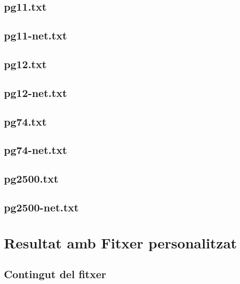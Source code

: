 \documentclass[11pt,a4paper,twoside]{report}
\begin{document}
\subsection{pg11.txt}
\small{}

\subsection{pg11-net.txt}
\small{}

\subsection{pg12.txt}
\small{}

\subsection{pg12-net.txt}
\small{}

\subsection{pg74.txt}
\small{}

\subsection{pg74-net.txt}
\small{}

\subsection{pg2500.txt}
\small{}

\subsection{pg2500-net.txt}
\small{}

\section{Resultat amb Fitxer personalitzat}
\subsection{Contingut del fitxer}
\small{}
\end{document}
